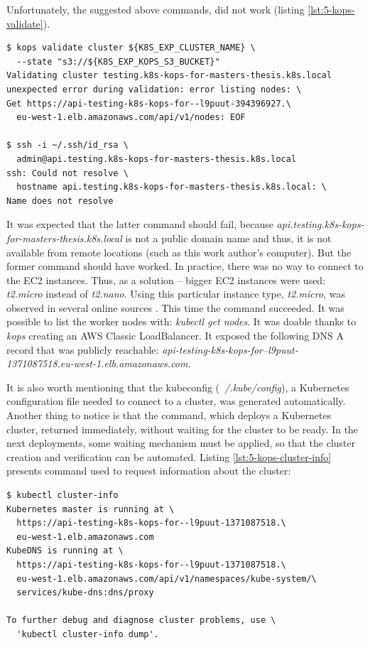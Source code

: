 Unfortunately, the suggested above commands, did not work (listing \ref{lst:5-kops-validate}).
\begin{lstlisting}[basicstyle=\scriptsize,xleftmargin=0cm,caption={Commands run to connect with a cluster created by \textit{kops} together with~output},label=lst:5-kops-validate]
$ kops validate cluster ${K8S_EXP_CLUSTER_NAME} \
  --state "s3://${K8S_EXP_KOPS_S3_BUCKET}"
Validating cluster testing.k8s-kops-for-masters-thesis.k8s.local
unexpected error during validation: error listing nodes: \
Get https://api-testing-k8s-kops-for--l9puut-394396927.\
  eu-west-1.elb.amazonaws.com/api/v1/nodes: EOF

$ ssh -i ~/.ssh/id_rsa \
  admin@api.testing.k8s-kops-for-masters-thesis.k8s.local
ssh: Could not resolve \
  hostname api.testing.k8s-kops-for-masters-thesis.k8s.local: \
Name does not resolve
\end{lstlisting}

It was expected that the latter command should fail, because \textit{api.testing.k8s-kops-for-masters-thesis.k8s.local} is not a public domain name and thus, it is not available from remote locations (such as this work author's computer). But the former command should have worked. In practice, there was no way to connect to the EC2 instances. Thus, as a solution -- bigger EC2 instances were used: \textit{t2.micro} instead of \textit{t2.nano}. Using this particular instance type, \textit{t2.micro}, was observed in several online sources \cite{online-perfect-k8s-blog,online-kops-sa,online-ha-k8s-blog}. This time the command succeeded. It was possible to list the worker nodes with: \textit{kubectl get nodes}. It was doable thanks to \textit{kops} creating an AWS Classic LoadBalancer. It exposed the following DNS A record that was publicly reachable: \textit{api-testing-k8s-kops-for--l9puut-1371087518.eu-west-1.elb.amazonaws.com}.

It is also worth mentioning that the kubeconfig (\textit{~/.kube/config}), a Kubernetes configuration file needed to connect to a cluster, was generated automatically. Another thing to notice is that the command, which deploys a Kubernetes cluster, returned immediately, without waiting for the cluster to be ready. In the next deployments, some waiting mechanism must be applied, so that the cluster creation and verification can be automated. Listing \ref{lst:5-kops-cluster-info} presents command used to request information about the cluster:
\begin{lstlisting}[basicstyle=\scriptsize,xleftmargin=0cm,caption={Command used to request information about a running Kubernetes cluster},label=lst:5-kops-cluster-info]
$ kubectl cluster-info
Kubernetes master is running at \
  https://api-testing-k8s-kops-for--l9puut-1371087518.\
  eu-west-1.elb.amazonaws.com
KubeDNS is running at \
  https://api-testing-k8s-kops-for--l9puut-1371087518.\
  eu-west-1.elb.amazonaws.com/api/v1/namespaces/kube-system/\
  services/kube-dns:dns/proxy

To further debug and diagnose cluster problems, use \
  'kubectl cluster-info dump'.
\end{lstlisting}

